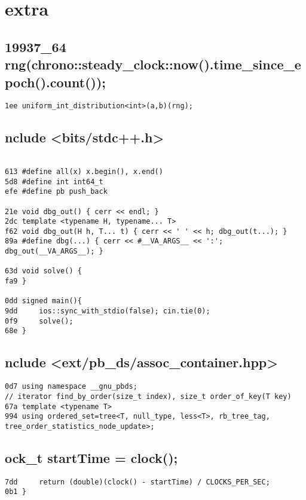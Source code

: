 \documentclass[11pt, a4paper, twoside]{article}
\begin{document}
\section{extra}

\subsection{19937_64 rng(chrono::steady_clock::now().time_since_epoch().count());}
\begin{lstlisting}
1ee uniform_int_distribution<int>(a,b)(rng);
\end{lstlisting}

\subsection{nclude <bits/stdc++.h>}
\begin{lstlisting}

613 #define all(x) x.begin(), x.end()
5d8 #define int int64_t
efe #define pb push_back

21e void dbg_out() { cerr << endl; }
2dc template <typename H, typename... T>
f62 void dbg_out(H h, T... t) { cerr << ' ' << h; dbg_out(t...); }
89a #define dbg(...) { cerr << #__VA_ARGS__ << ':'; dbg_out(__VA_ARGS__); }

63d void solve() {
fa9 }

0dd signed main(){
9dd 	ios::sync_with_stdio(false); cin.tie(0);
0f9 	solve();
68e }
\end{lstlisting}

\subsection{nclude <ext/pb_ds/assoc_container.hpp>}
\begin{lstlisting}
0d7 using namespace __gnu_pbds;
// iterator find_by_order(size_t index), size_t order_of_key(T key)
67a template <typename T> 
994 using ordered_set=tree<T, null_type, less<T>, rb_tree_tag, tree_order_statistics_node_update>;
\end{lstlisting}

\subsection{ock_t startTime = clock();}
\begin{lstlisting}
7dd 	return (double)(clock() - startTime) / CLOCKS_PER_SEC;
0b1 }
\end{lstlisting}
\end{document}
